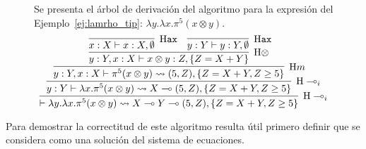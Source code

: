 

\begin{figure}[H]
\begin{ejemplo}
    Se presenta el árbol de derivación del algoritmo para la expresión del Ejemplo~\ref{ej:lamrho_tip}: $\lambda y.\lambda x.\pi^5(x \otimes y)$.
\begin{equation*}
\infer[\text{H}\multimap_i]
{\vdash\lambda y.\lambda x.\pi^5(x\otimes y) \leadsto X \multimap Y \multimap (5, Z), \{Z=X+Y, Z \geq 5\}}
{\infer[\text{H}\multimap_i]
    {y : Y \vdash\lambda x.\pi^5(x\otimes y) \leadsto X \multimap (5, Z), \{Z=X+Y, Z \geq 5\}}
    {\infer[\text{H}m]
        {y : Y, x:X \vdash\pi^5(x\otimes y) \leadsto (5, Z), \{Z=X+Y, Z \geq 5\}}
        {\infer[\text{H}\otimes]
            {y: Y, x:X \vdash x\otimes y : Z, \{Z=X+Y\}}
            {\infer[\text{H}\mathtt{ax}]{x:X \vdash x : X, \emptyset}{} \quad \infer[\text{H}\mathtt{ax}]{y:Y \vdash y :Y, \emptyset}{}}
    }}}
\end{equation*}
\end{ejemplo}
\end{figure}
Para demostrar la correctitud de este algoritmo resulta útil primero definir que se considera como una solución del sistema de ecuaciones.

